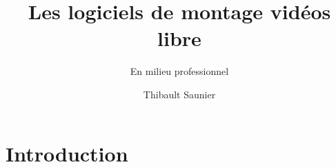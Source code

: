 \documentclass[a4paper,11pt]{article}
\begin{document}
\title{Les logiciels de montage vid\'eos libre}
\subtitle{En milieu professionnel}
\author{Thibault Saunier}
\withdate
\subject{Les logiciels de montage vid\'eos libre en milieu professionnel}
\maketitle



\tableofcontents



%




\section{Introduction}

\end{document}
